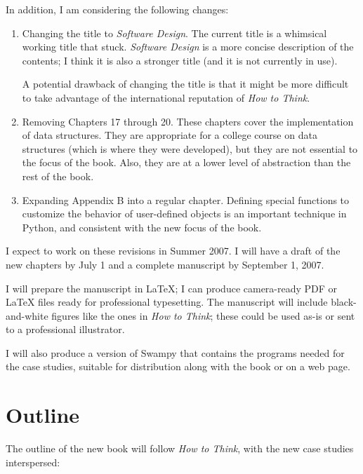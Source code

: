 \documentclass{article}
\begin{document}
\pagebreak
In addition, I am considering the following changes:

\begin{enumerate}

\item Changing the title to {\em Software Design}.  The current title is a
whimsical working title that stuck.  {\em Software Design} is a more
concise description of the contents; I think it is also a stronger
title (and it is not currently in use).

A potential drawback of changing the title is that it might be more
difficult to take advantage of the international reputation of {\em How to
Think}.

\item Removing Chapters 17 through 20.  These chapters cover the
implementation of data structures.  They are appropriate for a college
course on data structures (which is where they were developed), but
they are not essential to the focus of the book.  Also, they are at a
lower level of abstraction than the rest of the book.

\item Expanding Appendix B into a regular chapter.  Defining special
functions to customize the behavior of user-defined objects is
an important technique in Python, and consistent with the new
focus of the book.

\end{enumerate}

I expect to work on these revisions in Summer 2007.  I will have
a draft of the new chapters by July 1 and a complete manuscript by
September 1, 2007.

I will prepare the manuscript in LaTeX; I can produce camera-ready PDF
or LaTeX files ready for professional typesetting.  The manuscript
will include black-and-white figures like the ones in {\em How to Think};
these could be used as-is or sent to a professional illustrator.

I will also produce a version of Swampy that contains the programs
needed for the case studies, suitable for distribution along with the
book or on a web page.


\section*{Outline}

The outline of the new book will follow {\em How to Think}, with the new
case studies interspersed:
\end{document}
